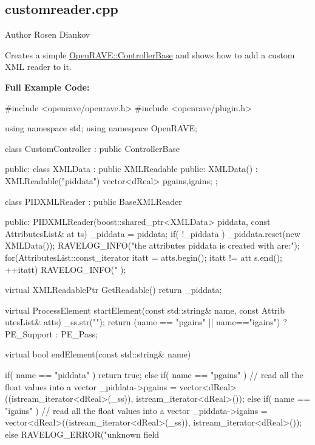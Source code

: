 \hypertarget{customreader.cpp-example}{
\subsection{customreader.cpp}
}
\begin{DoxyAuthor}{Author}
Rosen Diankov
\end{DoxyAuthor}
Creates a simple \hyperlink{classOpenRAVE_1_1ControllerBase}{OpenRAVE::ControllerBase} and shows how to add a custom XML reader to it.

{\bfseries Full Example Code:}


\begin{DoxyCodeInclude}

#include <openrave/openrave.h>
#include <openrave/plugin.h>

using namespace std;
using namespace OpenRAVE;

class CustomController : public ControllerBase
{
public:
    class XMLData : public XMLReadable
    {
public:
        XMLData() : XMLReadable("piddata") {
        }
        vector<dReal> pgains,igains;
    };

    class PIDXMLReader : public BaseXMLReader
    {
public:
        PIDXMLReader(boost::shared_ptr<XMLData> piddata, const AttributesList& at
      ts) {
            _piddata = piddata;
            if( !_piddata )
                _piddata.reset(new XMLData());
            RAVELOG_INFO("the attributes piddata is created with are:\n");
            for(AttributesList::const_iterator itatt = atts.begin(); itatt != att
      s.end(); ++itatt)
                RAVELOG_INFO("%
      );
        }

        virtual XMLReadablePtr GetReadable() {
            return _piddata;
        }

        virtual ProcessElement startElement(const std::string& name, const Attrib
      utesList& atts) {
            _ss.str("");
            return (name == "pgains" || name=="igains") ? PE_Support : PE_Pass;
        }

        virtual bool endElement(const std::string& name)
        {
            if( name == "piddata" )
                return true;
            else if( name == "pgains" )
                // read all the float values into a vector
                _piddata->pgains = vector<dReal>((istream_iterator<dReal>(_ss)), 
      istream_iterator<dReal>());
            else if( name == "igains" )
                // read all the float values into a vector
                _piddata->igains = vector<dReal>((istream_iterator<dReal>(_ss)), 
      istream_iterator<dReal>());
            else
                RAVELOG_ERROR("unknown field %

}}}
\end{DoxyCodeInclude}
